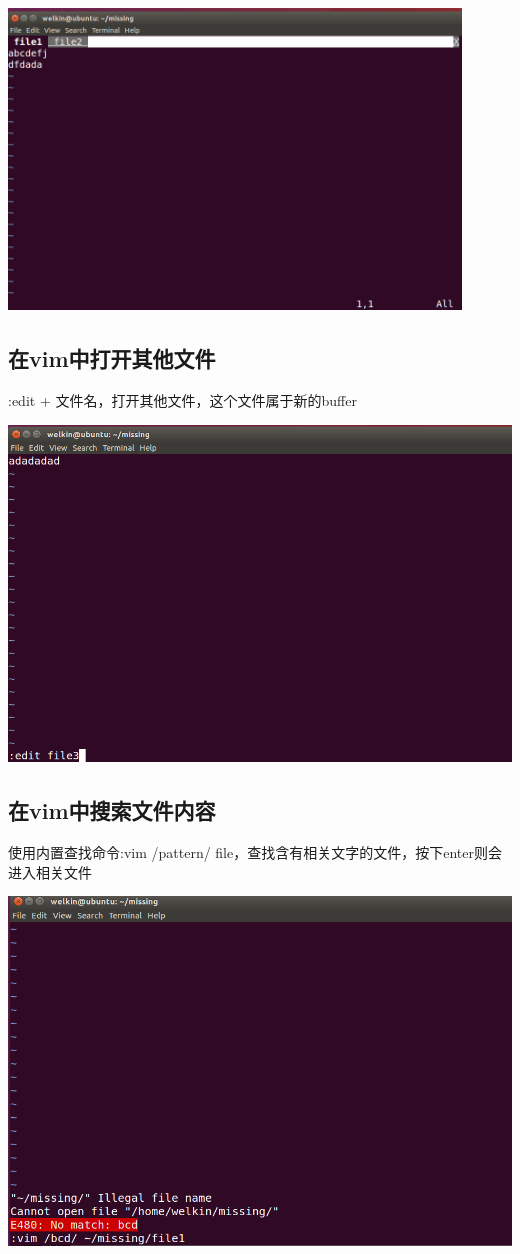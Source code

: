 \documentclass[UTF8,a4paper]{ctexart}
\begin{document}
\begin{sloppypar}
	\includegraphics[width = 12cm]{18}
	
	\subsection{在vim中打开其他文件}
	:edit + 文件名，打开其他文件，这个文件属于新的buffer
	
	\includegraphics[width = 16cm]{191}
	
	\subsection{在vim中搜索文件内容}
	使用内置查找命令:vim /pattern/ file，查找含有相关文字的文件，按下enter则会进入相关文件
	
	\includegraphics[width = 16cm]{201}


\end{sloppypar}
\end{document}
